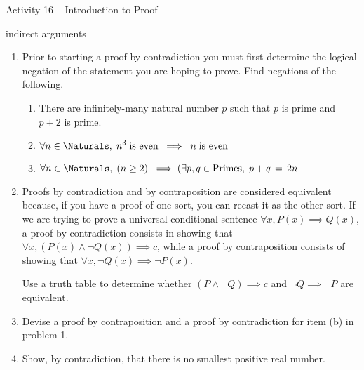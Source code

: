 \documentclass{amsart}
\begin{document}
\thispagestyle{empty}

\centerline{\Large Activity 16 -- Introduction to Proof}
\centerline{\large indirect arguments}

\bigskip
\Large


\begin{enumerate}

\item Prior to starting a proof by contradiction you must first determine the logical negation of the statement you are hoping to prove.  Find negations of the following.
\begin{enumerate}
\item \rule[-6pt]{0pt}{24pt} There are infinitely-many natural number $p$ such that $p$ is prime and $p+2$ is prime.
\item \rule[-6pt]{0pt}{24pt} $\displaystyle \forall n \in \Naturals, \; n^3 \; \mbox{is even} \; \implies \; n \; \mbox{is even} $
\item \rule[-6pt]{0pt}{24pt} $\displaystyle \forall n \in \Naturals, \; ( n \geq 2 ) \; \implies (\exists p,q \in \mbox{Primes}, \; p+q \, = \, 2n$
\end{enumerate}

\vfill

\item Proofs by contradiction and by contraposition are considered equivalent because, if you have a proof of one sort, you can recast it as the other sort.  If we are trying to prove a universal conditional sentence $\forall x, P(x) \implies Q(x)$,
a proof by contradiction consists in showing that $\forall x, (P(x) \land \lnot Q(x)) \implies c$, while a proof by contraposition consists of showing that  $\forall x, \lnot Q(x) \implies \lnot P(x)$.

Use a truth table to determine whether $(P \land \lnot Q) \implies c$ and $\lnot Q \implies \lnot P$ are equivalent.

\vfill

\vfill

\newpage

\item Devise a proof by contraposition and a proof by contradiction for item (b) in problem 1.

\vfill

\item Show, by contradiction, that there is no smallest positive real number.

\vfill

\newpage


\end{enumerate}
\end{document}
